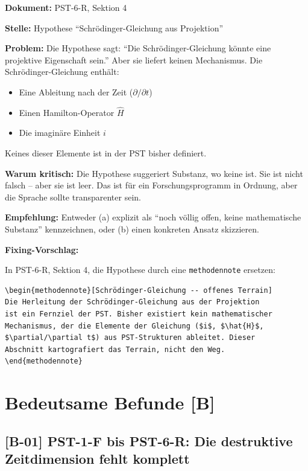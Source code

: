 \documentclass[11pt,a4paper]{article}
\newcommand{\B}[1]{\textbf{[B-#1]}}
\newcommand{\Dok}[1]{\noindent\textbf{Dokument:} #1\par\smallskip}
\newcommand{\Stelle}[1]{\noindent\textbf{Stelle:} #1\par\smallskip}
\newcommand{\Prob}[1]{\noindent\textbf{Problem:} #1\par\smallskip}
\newcommand{\Krit}[1]{\noindent\textbf{Warum kritisch:} #1\par\smallskip}
\newcommand{\Empf}[1]{\noindent\textbf{Empfehlung:} #1\par\smallskip}
\newenvironment{Fix}
  {\par\medskip\noindent\textbf{Fixing-Vorschlag:}\par\nobreak\smallskip}
  {\par\medskip}
\begin{document}
\Dok{PST-6-R, Sektion 4}
\Stelle{Hypothese ``Schrödinger-Gleichung aus Projektion''}
\Prob{Die Hypothese sagt: ``Die Schrödinger-Gleichung könnte
eine projektive Eigenschaft sein.'' Aber sie liefert keinen
Mechanismus. Die Schrödinger-Gleichung enthält:
\begin{itemize}
  \item Eine Ableitung nach der Zeit ($\partial/\partial t$)
  \item Einen Hamilton-Operator $\hat{H}$
  \item Die imaginäre Einheit $i$
\end{itemize}
Keines dieser Elemente ist in der PST bisher definiert.}
\Krit{Die Hypothese suggeriert Substanz, wo keine ist. Sie ist nicht
falsch -- aber sie ist leer. Das ist für ein Forschungsprogramm in
Ordnung, aber die Sprache sollte transparenter sein.}
\Empf{Entweder (a) explizit als ``noch völlig offen, keine
mathematische Substanz'' kennzeichnen, oder (b) einen konkreten
Ansatz skizzieren.}
\begin{Fix}
In PST-6-R, Sektion 4, die Hypothese durch eine
\texttt{methodennote} ersetzen:
\begin{verbatim}
\begin{methodennote}[Schrödinger-Gleichung -- offenes Terrain]
Die Herleitung der Schrödinger-Gleichung aus der Projektion
ist ein Fernziel der PST. Bisher existiert kein mathematischer
Mechanismus, der die Elemente der Gleichung ($i$, $\hat{H}$,
$\partial/\partial t$) aus PST-Strukturen ableitet. Dieser
Abschnitt kartografiert das Terrain, nicht den Weg.
\end{methodennote}
\end{verbatim}
\end{Fix}

\newpage

\section{Bedeutsame Befunde [B]}

\subsection{\B{01} PST-1-F bis PST-6-R: Die destruktive Zeitdimension
fehlt komplett}
\end{document}
